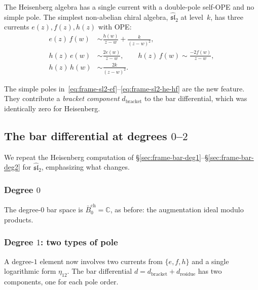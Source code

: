 The Heisenberg algebra has a single current with a double-pole
self-OPE and no simple pole.  The simplest non-abelian chiral
algebra, $\widehat{\mathfrak{sl}}_2$ at level~$k$, has three
currents $e(z), f(z), h(z)$ with OPE:
\begin{align}
e(z)\, f(w) &\sim \frac{h(w)}{z-w}
  + \frac{k}{(z-w)^2}, \label{eq:frame-sl2-ef} \\
h(z)\, e(w) &\sim \frac{2e(w)}{z-w}, \qquad
h(z)\, f(w) \sim \frac{-2f(w)}{z-w},
  \label{eq:frame-sl2-he-hf} \\
h(z)\, h(w) &\sim \frac{2k}{(z-w)^2}.
  \label{eq:frame-sl2-hh}
\end{align}

The simple poles in~\eqref{eq:frame-sl2-ef}--\eqref{eq:frame-sl2-he-hf}
are the new feature.  They contribute a
\emph{bracket component} $d_{\mathrm{bracket}}$ to the bar
differential, which was identically zero for Heisenberg.

\subsection{\texorpdfstring{The bar differential at degrees $0$--$2$}{The bar differential at degrees 0--2}}
\label{subsec:frame-sl2-bar-low-degree}

We repeat the Heisenberg computation of \S\ref{sec:frame-bar-deg1}--\S\ref{sec:frame-bar-deg2} for $\widehat{\mathfrak{sl}}_2$, emphasizing what changes.

\subsubsection*{Degree $0$}
The degree-$0$ bar space is $\bar{B}_0^{\mathrm{ch}} = \mathbb{C}$,
as before: the augmentation ideal modulo products.

\subsubsection*{Degree $1$: two types of pole}
A degree-$1$ element now involves two currents from $\{e, f, h\}$
and a single logarithmic form $\eta_{12}$.  The bar differential
$d = d_{\mathrm{bracket}} + d_{\mathrm{residue}}$ has two
components, one for each pole order.

